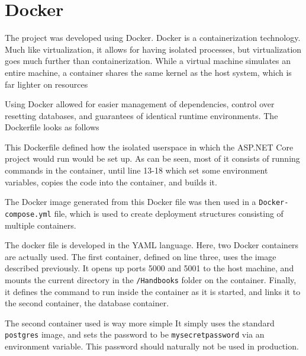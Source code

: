 \section{Docker}
The project was developed using Docker.
Docker is a containerization technology.
Much like virtualization, it allows for having isolated processes, but virtualization goes much further than containerization.
While a virtual machine simulates an entire machine, a container shares the same kernel as the host system, which is far lighter on resources


Using Docker allowed for easier management of dependencies, control over resetting databases, and guarantees of identical runtime environments.
The Dockerfile looks as follows

This Dockerfile defined how the isolated userspace in which the ASP.NET Core project would run would be set up.
As can be seen, most of it consists of running commands in the container, until line 13-18 which set some environment variables, copies the code into the container, and builds it.

The Docker image generated from this Docker file was then used in a \texttt{Docker-compose.yml} file, which is used to create deployment structures consisting of multiple containers.

The docker file is developed in the YAML language.
Here, two Docker containers are actually used.
The first container, defined on line three, uses the image described previously.
It opens up ports 5000 and 5001 to the host machine, and mounts the current directory in the \texttt{/Handbooks} folder on the container.
Finally, it defines the command to run inside the container as it is started, and links it to the second container, the database container.

The second container used is way more simple
It simply uses the standard \texttt{postgres} image, and sets the password to be \texttt{mysecretpassword} via an environment variable.
This password should naturally not be used in production.
